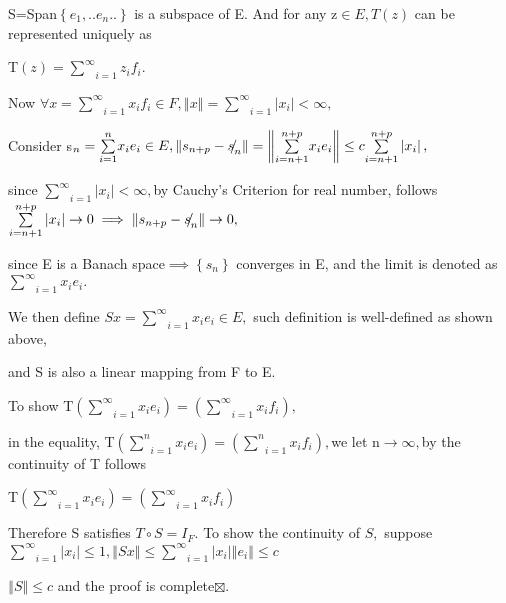 \documentclass{article}
\begin{document}
S=Span$\left\{ e_{1},..e_{n}..\right\} $ is a subspace of E. And for any z$%
\in E,T\left( z\right) $ can be represented uniquely as 

T$\left( z\right) =\underset{i=1}{\overset{\infty }{\sum }}z_{i}f_{i}.$

Now $\forall x=\underset{i=1}{\overset{\infty }{\sum }}x_{i}f_{i}\in
F,\left\Vert x\right\Vert =\underset{i=1}{\overset{\infty }{\sum }}%
\left\vert x_{i}\right\vert <\infty ,$

\bigskip Consider s$_{n}=\underset{i=1}{\overset{n}{\sum }}x_{i}e_{i}\in
E,\left\Vert s_{n+p}-\NEG{s}_{n}\right\Vert =\left\Vert \underset{i=n+1}{%
\overset{n+p}{\sum }}x_{i}e_{i}\right\Vert \leq c\underset{i=n+1}{\overset{%
n+p}{\sum }}\left\vert x_{i}\right\vert ,$

since $\underset{i=1}{\overset{\infty }{\sum }}\left\vert x_{i}\right\vert
<\infty ,$by Cauchy's Criterion for real number, follows $\underset{i=n+1}{%
\overset{n+p}{\sum }}\left\vert x_{i}\right\vert \rightarrow 0\implies
\left\Vert s_{n+p}-\NEG{s}_{n}\right\Vert \rightarrow 0,$

since E is a Banach space$\implies \left\{ s_{n}\right\} $ converges in E,
and the limit is denoted as $\underset{i=1}{\overset{\infty }{\sum }}%
x_{i}e_{i}.$

We then define $Sx=\underset{i=1}{\overset{\infty }{\sum }}x_{i}e_{i}\in E,$%
such definition is well-defined as shown above,

and S is also a linear mapping from F to E. 

\bigskip To show T$\left( \underset{i=1}{\overset{\infty }{\sum }}%
x_{i}e_{i}\right) =\left( \underset{i=1}{\overset{\infty }{\sum }}%
x_{i}f_{i}\right) ,$

in the equality, T$\left( \underset{i=1}{\overset{n}{\sum }}%
x_{i}e_{i}\right) =\left( \underset{i=1}{\overset{n}{\sum }}%
x_{i}f_{i}\right) ,$we let n$\rightarrow \infty ,$by the continuity of T
follows 

T$\left( \underset{i=1}{\overset{\infty }{\sum }}x_{i}e_{i}\right) =\left( 
\underset{i=1}{\overset{\infty }{\sum }}x_{i}f_{i}\right) $

Therefore S satisfies $T\circ S=I_{F}.$ To show the continuity of $S,$%
suppose $\underset{i=1}{\overset{\infty }{\sum }}\left\vert x_{i}\right\vert
\leq 1,\left\Vert Sx\right\Vert \leq \underset{i=1}{\overset{\infty }{\sum }}%
\left\vert x_{i}\right\vert \left\Vert e_{i}\right\Vert \leq c$

\bigskip $\left\Vert S\right\Vert \leq c$ and the proof is complete$%
\boxtimes .$
\end{document}
